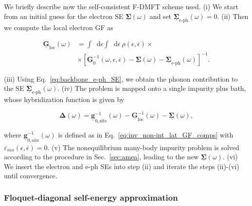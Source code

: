 \documentclass[aps,prb,groupedaddress,showpacs,twocolumn,superscriptaddress,10pt]{revtex4-2}
\newcommand*\dd{\mathop{}\!\mathrm{d}}
\newcommand{\mat}[1]{\bm{#1}} %
\newcommand{\kel}[1]{\underline{#1}} %
\begin{document}
We briefly describe now the self-consistent F-DMFT scheme used.
(i) We start from an initial guess for the electron SE $\kel{\mat{\Sigma}}(\omega)$ and set $\kel{\mat \Sigma}_{\text{e-ph}}(\omega)=0$. (ii) Then we compute the local electron GF as 

\begin{equation}\label{eq:Lat_LocGF}
\begin{split}
\kel{\mat G}_{\text{loc}}(\omega) &= \int \dd\epsilon \int \dd\overline{\epsilon} \ \rho(\epsilon,\overline{\epsilon}) \times \\ 
&\times \left[\kel{\mat G}^{-1}_{0}(\omega,\epsilon,\overline{\epsilon}) - \kel{\mat\Sigma}(\omega) - \kel{\mat \Sigma}_{\text{e-ph}}(\omega) \right]^{-1}.
\end{split}
\end{equation}
 
(iii) Using Eq.~\eqref{eq:backbone_e-ph_SE}, we obtain the phonon contribution to the SE $\kel{\mat{\Sigma}}_{\text{e-ph}}(\omega)$.
(iv) The problem is mapped onto a single impurity plus bath, whose hybridization function
is given by
 
\begin{equation}\label{eq:imp_Dyson_eq}
\kel{\mat{\Delta}}(\omega) = \kel{\mat{g}}^{-1}_{0,\text{site}}(\omega) - \kel{\mat{G}}^{-1}_{\text{loc}}(\omega) - \kel{\mat{\Sigma}}(\omega),
\end{equation}
 
where $\kel{\mat{g}}^{-1}_{0,\text{site}}(\omega)$ is defined as in Eq.~\eqref{eq:inv_non-int_lat_GF_comps} with $\varepsilon_{mn}(\epsilon,\overline{\epsilon})=0$. (v) The nonequilibrium many-body impurity problem is solved according to the procedure in Sec.~\ref{sec:amea}, leading to the new
 $\kel{\mat{\Sigma}}(\omega)$. (vi) We insert the electron and e-ph SEs into step (ii) and iterate the steps (ii)-(vi) until convergence.

\subsubsection{Floquet-diagonal self-energy approximation}
\label{sec:FDSA} 
 
\end{document}
